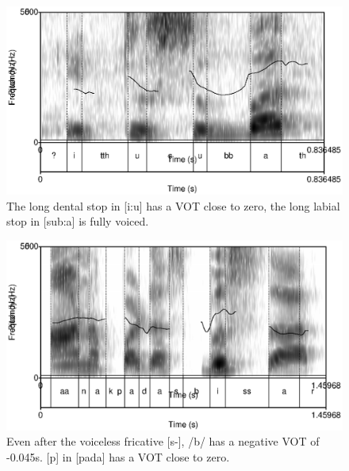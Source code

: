\begin{figure}
 \centering
 \includegraphics[height=0.3\textheight]{./pics/itthusubbath.eps}
%
 \caption[VOT of geminate /\dentt:/ and /b:/]{The  long dental stop in [i\dentt:u] has a VOT close to zero, the  long labial stop in [sub:a\dentt] is fully voiced.}
 \label{fig:phon:vot:itthusubbath}
\end{figure}




\begin{figure}
 \centering
 \includegraphics[height=0.3\textheight]{./pics/sbissar.eps}

 \caption[VOT of /b/ after /s/]{Even after the voiceless fricative [s-], /b/  has a negative VOT of -0.045s. [p] in [pada] has a VOT close to zero.}
 \label{fig:phon:vot:bissar}
\end{figure}


